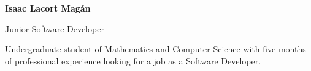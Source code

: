 \documentclass{article}
\begin{document}
\thispagestyle{empty} 
\begin{minipage}{0.4\linewidth}
\textbf{\huge{Isaac Lacort Magán}}

\large{\color{BlueViolet}Junior Software Developer}
\end{minipage}
\hspace{1cm}
\begin{minipage}{0.5\linewidth}
  \vspace{0.2cm}
\begin{center}
  \large Undergraduate student of Mathematics and Computer Science with five months of professional experience looking for a job as a Software Developer.
\end{center}
\end{minipage}
\vspace{1cm}
\end{document}

